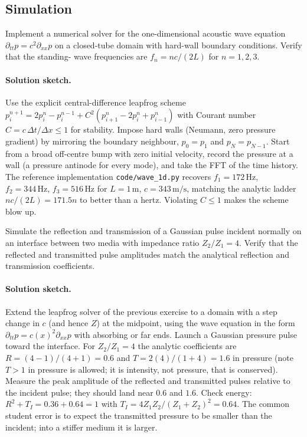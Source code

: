 \subsection*{Simulation}

\begin{exercise}
Implement a numerical solver for the one-dimensional acoustic wave
equation $\partial_{tt} p = c^2 \partial_{xx} p$ on a closed-tube
domain with hard-wall boundary conditions. Verify that the standing-
wave frequencies are $f_n = n c/(2L)$ for $n = 1, 2, 3$.
\paragraph{Solution sketch.} Use the explicit central-difference
leapfrog scheme $p^{n+1}_i = 2p^n_i - p^{n-1}_i + C^2(p^n_{i+1} -
2p^n_i + p^n_{i-1})$ with Courant number $C = c\,\Delta t/\Delta x \le
1$ for stability. Impose hard walls (Neumann, zero pressure gradient)
by mirroring the boundary neighbour, $p_0 = p_1$ and $p_{N} =
p_{N-1}$. Start from a broad off-centre bump with zero initial
velocity, record the pressure at a wall (a pressure antinode for every
mode), and take the FFT of the time history. The reference
implementation \texttt{code/wave\_1d.py} recovers
$f_1 = 172\,\si{\hertz}$, $f_2 = 344\,\si{\hertz}$,
$f_3 = 516\,\si{\hertz}$ for $L=1\,\si{\meter}$, $c=343\,\si{
\meter\per\second}$, matching the analytic ladder $nc/(2L) = 171.5n$ to
better than a hertz. Violating $C\le 1$ makes the scheme blow up.
\end{exercise}

\begin{exercise}
Simulate the reflection and transmission of a Gaussian pulse incident
normally on an interface between two media with impedance ratio
$Z_2/Z_1 = 4$. Verify that the reflected and transmitted pulse
amplitudes match the analytical reflection and transmission
coefficients.
\paragraph{Solution sketch.} Extend the leapfrog solver of the
previous exercise to a domain with a step change in $c$ (and hence $Z$)
at the midpoint, using the wave equation in the form
$\partial_{tt}p = c(x)^2\partial_{xx}p$ with absorbing or far ends.
Launch a Gaussian pressure pulse toward the interface. For $Z_2/Z_1 =
4$ the analytic coefficients are $R = (4-1)/(4+1) = 0.6$ and
$T = 2(4)/(1+4) = 1.6$ in pressure (note $T>1$ in pressure is allowed;
it is intensity, not pressure, that is conserved). Measure the peak
amplitude of the reflected and transmitted pulses relative to the
incident pulse; they should land near $0.6$ and $1.6$. Check energy:
$R^2 + T_I = 0.36 + 0.64 = 1$ with $T_I = 4Z_1Z_2/(Z_1+Z_2)^2 = 0.64$.
The common student error is to expect the transmitted pressure to be
smaller than the incident; into a stiffer medium it is larger.
\end{exercise}


